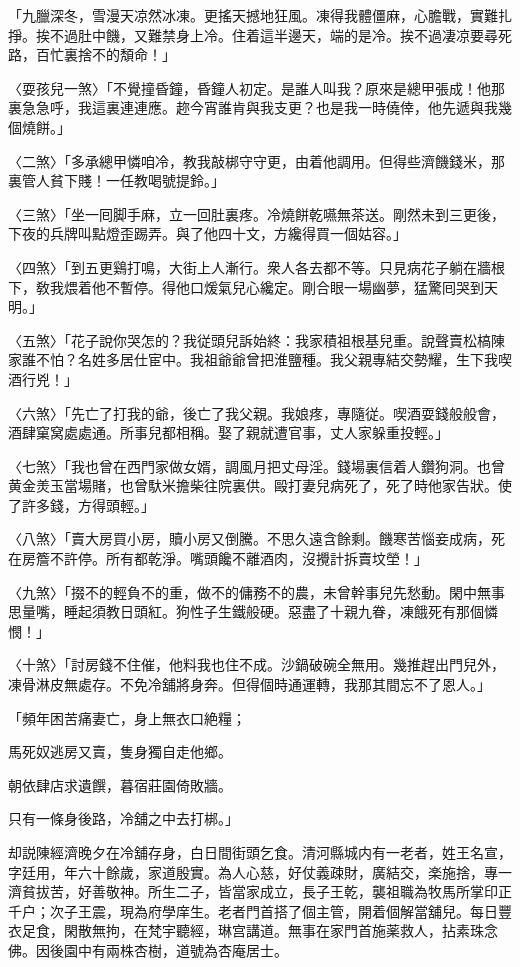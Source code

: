 「九臘深冬，雪漫天凉然冰凍。更搖天撼地狂風。凍得我體僵麻，心膽戰，實難扎掙。挨不過肚中饑，又難禁身上冷。住着這半邊天，端的是冷。挨不過凄凉要尋死路，百忙裏捨不的頽命！」

〈耍孩兒一煞〉「不覺撞昏鐘，昏鐘人初定。是誰人叫我？原來是總甲張成！他那裏急急呼，我這裏連連應。趂今宵誰肯與我支更？也是我一時僥倖，他先遞與我幾個燒餅。」

〈二煞〉「多承總甲憐咱冷，教我敲梆守守更，由着他調用。但得些濟饑錢米，那裏管人貧下賤！一任教喝號提鈴。」

〈三煞〉「坐一囘脚手麻，立一回肚裏疼。冷燒餅乾嚥無茶送。剛然未到三更後，下夜的兵牌叫點燈歪踢弄。與了他四十文，方纔得買一個姑容。」

〈四煞〉「到五更鷄打鳴，大街上人漸行。衆人各去都不等。只見病花子躺在牆根下，敎我煨着他不暫停。得他口煖氣兒心纔定。剛合眼一場幽夢，猛驚囘哭到天明。」

〈五煞〉「花子說你哭怎的？我従頭兒訴始終：我家積祖根基兒重。說聲賣松槁陳家誰不怕？名姓多居仕宦中。我祖爺爺曾把淮鹽種。我父親專結交勢耀，生下我喫酒行兇！」

〈六煞〉「先亡了打我的爺，後亡了我父親。我娘疼，專隨従。喫酒耍錢般般會，酒肆窠窝處處通。所事兒都相稱。娶了親就遭官事，丈人家躲重投輕。」

〈七煞〉「我也曾在西門家做女婿，調風月把丈母淫。錢場裏信着人鑽狗洞。也曾黄金羙玉當場賭，也曾馱米擔柴往院裏供。毆打妻兒病死了，死了時他家告狀。使了許多錢，方得頭輕。」

〈八煞〉「賣大房買小房，贖小房又倒騰。不思久遠含餘剩。饑寒苦惱妾成病，死在房簷不許停。所有都乾淨。嘴頭饞不離酒肉，沒攪計拆賣坟塋！」

〈九煞〉「掇不的輕負不的重，做不的傭務不的農，未曾幹事兒先愁動。閑中無事思量嘴，睡起須教日頭紅。狗性子生鐵般硬。惡盡了十親九眷，凍餓死有那個憐憫！」

〈十煞〉「討房錢不住催，他料我也住不成。沙鍋破碗全無用。幾推趕出門兒外，凍骨淋皮無處存。不免冷舖將身奔。但得個時通運轉，我那其間忘不了恩人。」

「頻年困苦痛妻亡，身上無衣口絶糧；

馬死奴逃房又賣，隻身獨自走他鄉。

朝依肆店求遺饌，暮宿莊園倚敗牆。

只有一條身後路，冷舖之中去打梆。」

却説陳經濟晚夕在冷舖存身，白日間街頭乞食。清河縣城内有一老者，姓王名宣，字廷用，年六十餘歲，家道殷實。為人心慈，好仗義疎財，廣結交，楽施捨，專一濟貧拔苦，好善敬神。所生二子，皆當家成立，長子王乾，襲祖職為牧馬所掌印正千户；次子王震，現為府學庠生。老者門首搭了個主管，開着個解當舖兒。每日豐衣足食，閑散無拘，在梵宇聽經，琳宫講道。無事在家門首施薬救人，拈素珠念佛。因後園中有兩株杏樹，道號為杏庵居士。

